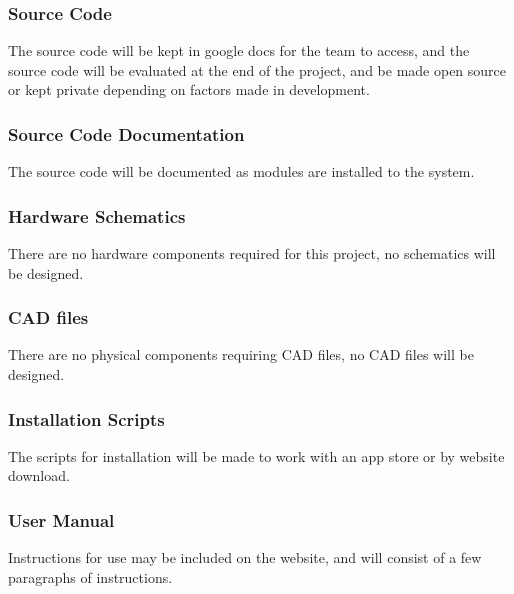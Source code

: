\subsubsection{Source Code}
The source code will be kept in google docs for the team to access, and the source code will be evaluated at the end of the project, and be made open source or kept private depending on factors made in development.

\subsubsection{Source Code Documentation}
The source code will be documented as modules are installed to the system.

\subsubsection{Hardware Schematics}
There are no hardware components required for this project, no schematics will be designed.

\subsubsection{CAD files}
There are no physical components requiring CAD files, no CAD files will be designed.

\subsubsection{Installation Scripts}
The scripts for installation will be made to work with an app store or by website download.

\subsubsection{User Manual}
Instructions for use may be included on the website, and will consist of a few paragraphs of instructions.